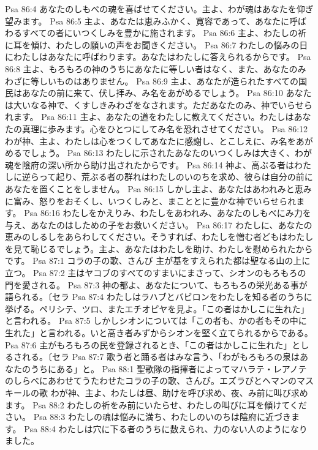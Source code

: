Psa 86:4  あなたのしもべの魂を喜ばせてください。主よ、わが魂はあなたを仰ぎ望みます。
Psa 86:5  主よ、あなたは恵みふかく、寛容であって、あなたに呼ばわるすべての者にいつくしみを豊かに施されます。
Psa 86:6  主よ、わたしの祈に耳を傾け、わたしの願いの声をお聞きください。
Psa 86:7  わたしの悩みの日にわたしはあなたに呼ばわります。あなたはわたしに答えられるからです。
Psa 86:8  主よ、もろもろの神のうちにあなたに等しい者はなく、また、あなたのみわざに等しいものはありません。
Psa 86:9  主よ、あなたが造られたすべての国民はあなたの前に来て、伏し拝み、み名をあがめるでしょう。
Psa 86:10  あなたは大いなる神で、くすしきみわざをなされます。ただあなたのみ、神でいらせられます。
Psa 86:11  主よ、あなたの道をわたしに教えてください。わたしはあなたの真理に歩みます。心をひとつにしてみ名を恐れさせてください。
Psa 86:12  わが神、主よ、わたしは心をつくしてあなたに感謝し、とこしえに、み名をあがめるでしょう。
Psa 86:13  わたしに示されたあなたのいつくしみは大きく、わが魂を陰府の深い所から助け出されたからです。
Psa 86:14  神よ、高ぶる者はわたしに逆らって起り、荒ぶる者の群れはわたしのいのちを求め、彼らは自分の前にあなたを置くことをしません。
Psa 86:15  しかし主よ、あなたはあわれみと恵みに富み、怒りをおそくし、いつくしみと、まこととに豊かな神でいらせられます。
Psa 86:16  わたしをかえりみ、わたしをあわれみ、あなたのしもべにみ力を与え、あなたのはしための子をお救いください。
Psa 86:17  わたしに、あなたの恵みのしるしをあらわしてください。そうすれば、わたしを憎む者どもはわたしを見て恥じるでしょう。主よ、あなたはわたしを助け、わたしを慰められたからです。
Psa 87:1  コラの子の歌、さんび 主が基をすえられた都は聖なる山の上に立つ。
Psa 87:2  主はヤコブのすべてのすまいにまさって、シオンのもろもろの門を愛される。
Psa 87:3  神の都よ、あなたについて、もろもろの栄光ある事が語られる。〔セラ
Psa 87:4  わたしはラハブとバビロンをわたしを知る者のうちに挙げる。ペリシテ、ツロ、またエチオピヤを見よ。「この者はかしこに生れた」と言われる。
Psa 87:5  しかしシオンについては「この者も、かの者もその中に生れた」と言われる。いと高き者みずからシオンを堅く立てられるからである。
Psa 87:6  主がもろもろの民を登録されるとき、「この者はかしこに生れた」としるされる。〔セラ
Psa 87:7  歌う者と踊る者はみな言う、「わがもろもろの泉はあなたのうちにある」と。
Psa 88:1  聖歌隊の指揮者によってマハラテ・レアノテのしらべにあわせてうたわせたコラの子の歌、さんび。エズラびとヘマンのマスキールの歌 わが神、主よ、わたしは昼、助けを呼び求め、夜、み前に叫び求めます。
Psa 88:2  わたしの祈をみ前にいたらせ、わたしの叫びに耳を傾けてください。
Psa 88:3  わたしの魂は悩みに満ち、わたしのいのちは陰府に近づきます。
Psa 88:4  わたしは穴に下る者のうちに数えられ、力のない人のようになりました。
